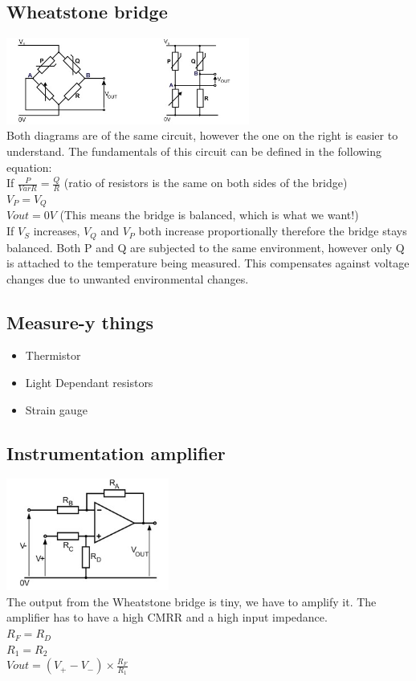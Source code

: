\documentclass[a4paper, 11pt, twocolumn]{article}
\begin{document}
    \subsection{Wheatstone bridge}
    \includegraphics[width=8cm]{wheatstoneBridge.jpg} \\
    Both diagrams are of the same circuit, however the one on the right is easier to understand.
    The fundamentals of this circuit can be defined in the following equation: \\
    If $\frac{P}{VarR}=\frac{Q}{R} $ (ratio of resistors is the same on both sides of the bridge)\\
    $V_P = V_Q$\\
    $Vout = 0V$ (This means the bridge is balanced, which is what we want!) \\
    If $V_S$ increases, $V_Q$ and $V_P$ both increase proportionally therefore the bridge stays balanced.
    Both P and Q are subjected to the same environment, however only Q is attached to the temperature being measured. This compensates against voltage changes due to unwanted environmental changes.
    \subsection{Measure-y things}
    \begin{itemize}
        \item Thermistor
        \item Light Dependant resistors
        \item Strain gauge
    \end{itemize}
    \subsection{Instrumentation amplifier}
    \includegraphics[width=0.4\textwidth]{instrumentationAmp.jpg} \\
    The output from the Wheatstone bridge is tiny, we have to amplify it. The amplifier has to have a high CMRR and a high input impedance. \\
    $R_F = R_D$\\
    $R_1 = R_2$\\
    $Vout = (V_+ - V_-)\times\frac{R_F}{R_1}$ \\
\end{document}
